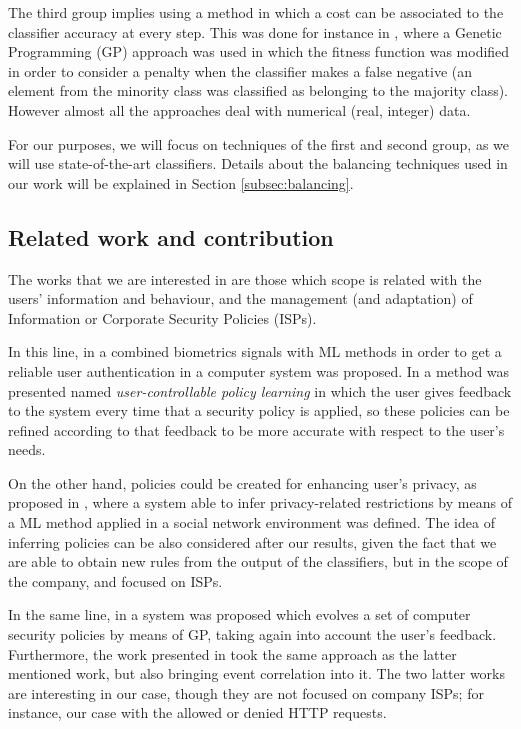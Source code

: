 \documentclass{llncs}
\begin{document}
The third group implies using a method in which a cost can be associated to the classifier accuracy at every step. This was done for instance  in \cite{cost_adjustment_07}, where  a Genetic Programming (GP) approach was used in which the fitness function was modified in order to consider a penalty when the classifier makes a false negative (an element from the minority class was classified as belonging to the majority class).
However almost all the approaches deal with numerical (real, integer)
data.

For our purposes, we will focus on techniques of the first and second group, as we will use state-of-the-art classifiers. Details about the balancing techniques used in our work will be explained in Section \ref{subsec:balancing}.

%
\subsection{Related work and contribution}
\label{subsec:relatedworks}

The works that we are interested in are those which scope is related with the users' information and behaviour, and the management (and adaptation) of Information or Corporate Security Policies (ISPs).

In this line, in \cite{cognitive_security_08} a combined biometrics signals with ML methods in order to get a reliable user authentication in a computer system was proposed. In \cite{user-controllable_learning_08}  a method was presented named \textit{user-controllable policy learning} in which the user gives feedback to the system every time that a security policy is applied, so these policies can be refined according to that feedback to be more accurate with respect to the user's needs.

On the other hand, policies could be created for enhancing user's privacy, as proposed  in \cite{inferring_policies_socialnetworks_09}, where a system able to infer privacy-related restrictions by means of a ML method applied in a social network environment was defined. The idea of inferring policies can be also considered after our results, given the fact that we are able to obtain new rules from the output of the classifiers, but in the scope of the company, and focused on ISPs.

In the same line, in \cite{sec_policy_evolution_gp_08,pol_evol_gp_3_approaches_08}  a system  was proposed which evolves a set of computer security policies by means of GP, taking again into account the user's feedback. Furthermore, the work presented in  \cite{rule_generation_gp_09} took the same approach as the latter mentioned work, but also bringing event correlation into it. The two latter works are interesting in our case, though they are not focused on company ISPs; for instance, our case with the allowed or denied HTTP requests.
\end{document}
